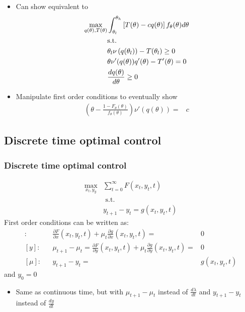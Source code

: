 \documentclass[compress]{beamer}
\begin{document}
\begin{frame}
  \begin{itemize}
  \item Can show equivalent to
    \begin{align}
      \max_{q(\theta),T(\theta)} & \int_{\theta_l}^{\theta_h} 
      \left[T(\theta) - cq(\theta)\right]
      f_\theta(\theta) d\theta \notag \\
      & \text{s.t.} \notag \\
      &\theta_l \nu\left(q(\theta_l)\right) - T(\theta_l) \geq 0
      \label{pcl} \\
      & \theta \nu'(q(\theta))q'(\theta) - T'(\theta) =  0 \label{lic2} \\
      & \frac{dq(\theta)}{d\theta} \geq  0 \label{mon2}
    \end{align}
  \item Manipulate first order conditions to eventually show
    \begin{align*}
      \left(\theta - \frac{1-F_\theta(\theta)}{f_\theta(\theta)}
      \right)\nu'(q(\theta)) = & c 
    \end{align*}
  \end{itemize}
\end{frame}
 
\subsection{Discrete time optimal control}

\begin{frame}
  \frametitle{Discrete time optimal control}
  \begin{align*}
    \max_{x_t,y_y} & \sum_{t=0}^\infty F(x_t,y_t,t) \\
    & \text{ s.t. } \\
    & y_{t+1} - y_t = g(x_t,y_t,t) 
  \end{align*}
  First order conditions can be written as:
  \begin{align*}
    [x]: && \frac{\partial F}{\partial x}(x_t,y_t,t)  + \mu_t \frac{\partial
      g}{\partial x}(x_t,y_t,t) = &  0 \\
    [y]: && \mu_{t+1}-\mu_t = \frac{\partial F}{\partial
      y}(x_t,y_t,t)  + \mu_t \frac{\partial 
      g}{\partial y}(x_t,y_t,t) = &  0 \\
    [\mu]:&& y_{t+1} - y_t = & g(x_t,y_t,t) 
  \end{align*}
  and $y_0 = 0$
  \begin{itemize}
  \item Same as continuous time, but with $\mu_{t+1} - \mu_t$ instead
    of $\frac{d\lambda}{dt}$ and $y_{t+1}-y_t$ instead of
    $\frac{dy}{dt}$
  \end{itemize}
\end{frame}
\end{document}
